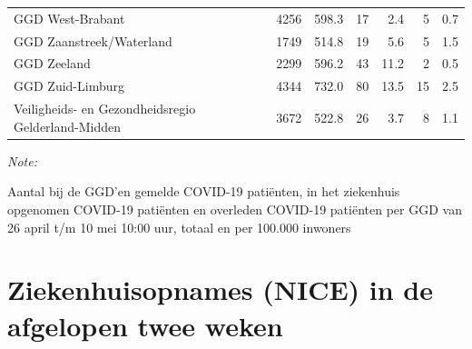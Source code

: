 \documentclass[
  english,
  man,floatsintext]{apa6}
\begin{document}
\begin{table}
\begin{threeparttable}
\begin{tabular}{lrrrrrr}
GGD West-Brabant & 4256 & 598.3 & 17 & 2.4 & 5 & 0.7\\
GGD Zaanstreek/Waterland & 1749 & 514.8 & 19 & 5.6 & 5 & 1.5\\
GGD Zeeland & 2299 & 596.2 & 43 & 11.2 & 2 & 0.5\\
GGD Zuid-Limburg & 4344 & 732.0 & 80 & 13.5 & 15 & 2.5\\
Veiligheids- en Gezondheidsregio Gelderland-Midden & 3672 & 522.8 & 26 & 3.7 & 8 & 1.1\\
\bottomrule
\end{tabular}
\begin{tablenotes}
\item \textit{Note: } 
\item Aantal bij de GGD’en gemelde COVID-19 patiënten, in het ziekenhuis opgenomen COVID-19 patiënten en overleden COVID-19 patiënten per GGD van 26 april t/m 10 mei 10:00 uur, totaal en per 100.000 inwoners
\end{tablenotes}
\end{threeparttable}
\endgroup{}
\end{table}

\newpage

\hypertarget{ziekenhuisopnames-nice-in-de-afgelopen-twee-weken}{%
\section{Ziekenhuisopnames (NICE) in de afgelopen twee weken}\label{ziekenhuisopnames-nice-in-de-afgelopen-twee-weken}}
\end{document}
